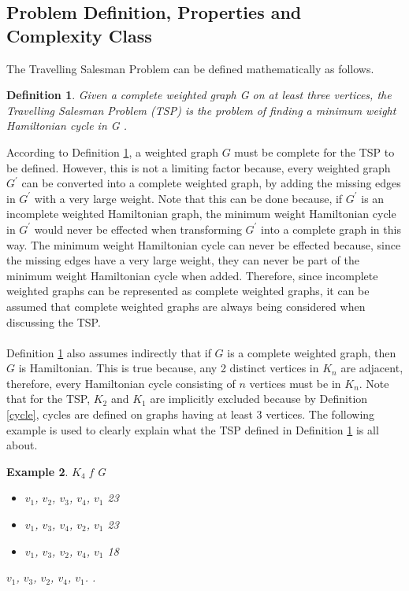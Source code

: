 \documentclass[12pt]{article}
\newtheorem{definition}{Definition}[subsection]
\newtheorem{example}[definition]{Example}
\numberwithin{equation}{subsection}
\numberwithin{table}{subsection}
\numberwithin{algorithm}{subsection}
\numberwithin{figure}{subsection}
\begin{document}
\subsection{Problem Definition, Properties and Complexity Class}
The Travelling Salesman Problem can be defined mathematically as follows.
\begin{definition}
\label{TSP}
Given a complete weighted graph G on at least three vertices, the Travelling Salesman Problem (TSP) is the problem of finding a minimum weight Hamiltonian cycle in G {}.
\end{definition}
According to Definition \ref{TSP}, a weighted graph $\mathit{G}$ must be complete for the TSP to be defined. However, this is not a limiting factor because, every weighted graph $\mathit{G^\prime}$ can be converted into a complete weighted graph, by adding the missing edges in $\mathit{G^\prime}$ with a very large weight. Note that this can be done because, if $\mathit{G^\prime}$ is an incomplete weighted Hamiltonian graph, the minimum weight Hamiltonian cycle in $\mathit{G^\prime}$ would never be effected when transforming $\mathit{G^\prime}$ into a complete graph in this way. The minimum weight Hamiltonian cycle can never be effected because, since the missing edges have a very large weight, they can never be part of the minimum weight Hamiltonian cycle when added. Therefore, since incomplete weighted graphs can be represented as complete weighted graphs, it can be assumed that complete weighted graphs are always being considered when discussing the TSP.\\\\
Definition \ref{TSP} also assumes indirectly that if $\mathit{G}$ is a complete weighted graph, then $\mathit{G}$ is Hamiltonian. This is true because, any 2 distinct vertices in $K_n$ are adjacent, therefore, every Hamiltonian cycle consisting of $n$ vertices must be in $K_n$. Note that for the TSP, $K_2$ and $K_1$ are implicitly excluded because by Definition \ref{cycle}, cycles are defined on graphs having at least 3 vertices. The following example is used to clearly explain what the TSP defined in Definition \ref{TSP} is all about.
\begin{example}
\label{example_2.1}
{} $K_4$ {} f {} G {}
\begin{itemize}
   \item $v_1$, $v_2$, $v_3$, $v_4$, $v_1$ {} 23
   \item $v_1$, $v_3$, $v_4$, $v_2$, $v_1$ {} 23
   \item $v_1$, $v_3$, $v_2$, $v_4$, $v_1$ {} 18
\end{itemize} 
{} $v_1$, $v_3$, $v_2$, $v_4$, $v_1$. {}. 
\end{example}
\end{document}
